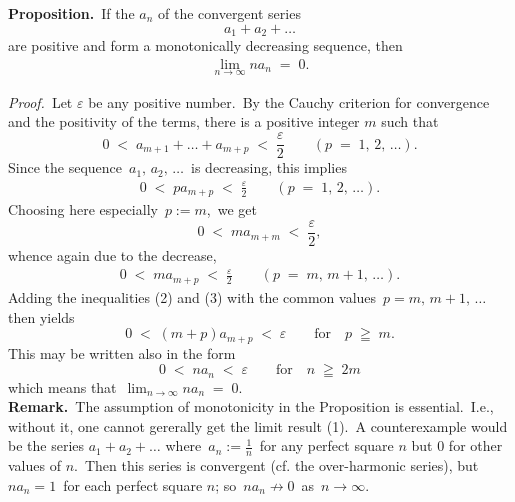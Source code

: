 \documentclass[12pt]{article}
\theoremstyle{definition}
\begin{document}
\textbf{Proposition.}\, If the  $a_n$ of the convergent series
$$a_1+a_2+\ldots$$
are positive and form a monotonically decreasing sequence, then 
\begin{align}
\lim_{n\to\infty}na_n \;=\; 0.
\end{align}

\emph{Proof.}\, Let $\varepsilon$ be any positive number.\, By the Cauchy criterion for convergence and the positivity of the terms, there is a positive integer $m$ such that
$$0 \;<\; a_{m+1}+\ldots+a_{m+p} \;<\; \frac{\varepsilon}{2} \qquad (p \;=\; 1,\,2,\,\ldots).$$
Since the sequence \,$a_1,\,a_2,\,\ldots$\, is decreasing, this implies
\begin{align}
0 \;<\; pa_{m+p} \;<\; \frac{\varepsilon}{2} \qquad (p \;=\; 1,\,2,\,\ldots).
\end{align}
Choosing here especially\, $p := m$,\, we get
$$0 \;<\; ma_{m+m} \;<\; \frac{\varepsilon}{2},$$
whence again due to the decrease,
\begin{align}
0 \;<\; ma_{m+p} \;<\; \frac{\varepsilon}{2} \qquad (p \;=\; m,\,m\!+\!1,\,\ldots).
\end{align}
Adding the inequalities (2) and (3) with the common values\, $p = m,\,m\!+\!1,\,\ldots$\, then yields
$$0 \;<\; (m\!+\!p)a_{m+p} \;<\; \varepsilon \qquad \mbox{for}\quad p \;\geqq\; m.$$
This may be written also in the form
$$0 \;<\; na_n \;<\; \varepsilon \qquad \mbox{for} \quad n\;\geqq\; 2m$$
which means that\, $\lim_{n\to\infty}na_n \;=\; 0$.\\

\textbf{Remark.}\, The assumption of monotonicity in the Proposition is essential.\, I.e., without it, one cannot gererally get the limit result (1).\, A counterexample would be the series $a_1\!+\!a_2\!+\ldots$ where\, 
$a_n := \frac{1}{n}$\, for any perfect square $n$ but 0 for other values of $n$.\, Then this series is convergent (cf. the over-harmonic series), but\, $na_n = 1$\, for each perfect square $n$; so\, $na_n \not\to 0$\, as\, $n \to \infty$.

\end{document}
